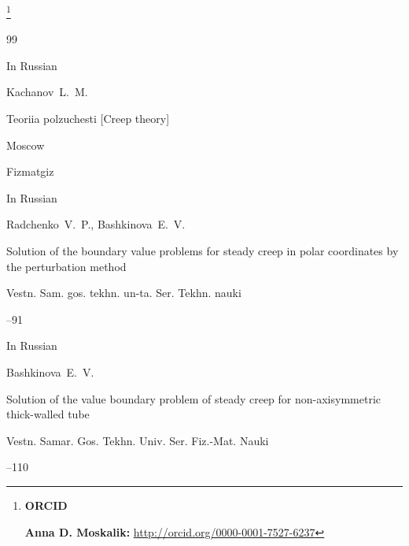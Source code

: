 \thanks{{\bf ORCID}



{\bf Anna D. Moskalik:} \url{http://orcid.org/0000-0001-7527-6237}





}





\EngRef







\begin{thebibliography}{99}




\lang In Russian

\by Kachanov~L.~M.

\book Teoriia polzuchesti \rm [Creep theory]

\publaddr Moscow

\publ Fizmatgiz








\lang In Russian

\by Radchenko~V.~P., Bashkinova~E.~V.

\paper Solution of the boundary value problems for steady creep in polar coordinates by the perturbation method

\jour Vestn. Sam. gos. tekhn. un-ta. Ser. Tekhn. nauki



--91




\lang In Russian

\by Bashkinova~E.~V.

\paper Solution of the  value boundary  problem of steady creep for non-axisymmetric  thick-walled tube

\serial Vestn. Samar. Gos. Tekhn. Univ. Ser. Fiz.-Mat. Nauki



--110







\end{thebibliography}
